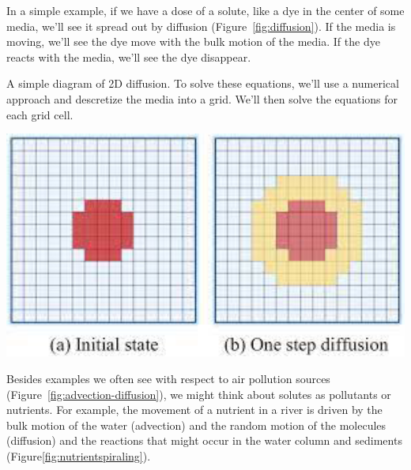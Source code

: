 \documentclass{tufte-handout}\usepackage[]{graphicx}\usepackage[]{xcolor}
\begin{document}
In a simple example, if we have a dose of a solute, like a dye in the center of some media, we'll see it spread out by diffusion (Figure~\ref{fig:diffusion}). If the media is moving, we'll see the dye move with the bulk motion of the media. If the dye reacts with the media, we'll see the dye disappear.

\begin{marginfigure}
\caption{A simple diagram of 2D diffusion. To solve these equations, we'll use a numerical approach and descretize the media into a grid. We'll then solve the equations for each grid cell.}
\label{fig:diffusion}
\includegraphics[width=1.0\textwidth]{graphics/2D_diffusion.png}
\end{marginfigure}


Besides examples we often see with respect to air pollution sources (Figure~\ref{fig:advection-diffusion}), we might think about solutes as pollutants or nutrients. For example, the movement of a nutrient in a river is driven by the bulk motion of the water (advection) and the random motion of the molecules (diffusion) and the reactions that might occur in the water column and sediments (Figure\ref{fig:nutrientspiraling}).
\end{document}
